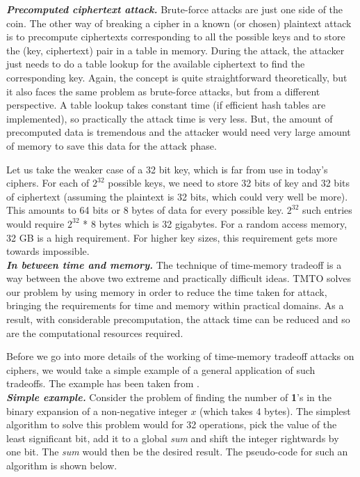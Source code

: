 \textit{\textbf{Precomputed ciphertext attack.}} Brute-force attacks are just one side of the coin. The other way of breaking a cipher in a known (or chosen) plaintext attack is to precompute ciphertexts corresponding to all the possible keys and to store the (key, ciphertext) pair in a table in memory. During the attack, the attacker just needs to do a table lookup for the available ciphertext to find the corresponding key. Again, the concept is quite straightforward theoretically, but it also faces the same problem as brute-force attacks, but from a different perspective. A table lookup takes constant time (if efficient hash tables are implemented), so practically the attack time is very less. But, the amount of precomputed data is tremendous and the attacker would need very large amount of memory to save this data for the attack phase. 

Let us take the weaker case of a 32 bit key, which is far from use in today's ciphers. For each of $2^{32}$ possible keys, we need to store 32 bits of key and 32 bits of ciphertext (assuming the plaintext is 32 bits, which could very well be more). This amounts to 64 bits or 8 bytes of data for every possible key. $2^{32}$ such entries would require $2^{32}$ * 8 bytes which is 32 gigabytes. For a random access memory, 32 GB is a high requirement. For higher key sizes, this requirement gets more towards impossible.\\

\textit{\textbf{In between time and memory.}} The technique of time-memory tradeoff is a way between the above two extreme and practically difficult ideas. TMTO solves our problem by using memory in order to reduce the time taken for attack, bringing the requirements for time and memory within  practical domains. As a result, with considerable precomputation, the attack time can be reduced and so are the computational resources required.

Before we go into more details of the working of time-memory tradeoff attacks on ciphers, we would take a simple example of a general application of such tradeoffs. The example has been taken from \cite{stamp2003out}. \\

\textit{\textbf{Simple example.}} Consider the problem of finding the number of \textbf{1}'s in the binary expansion of a non-negative integer $x$ (which takes $4$ bytes). The simplest algorithm to solve this problem would for 32 operations, pick the value of the least significant bit, add it to a global \textit{sum} and shift the integer rightwards by one bit. The \textit{sum} would then be the desired result. The pseudo-code for such an algorithm is shown below.

